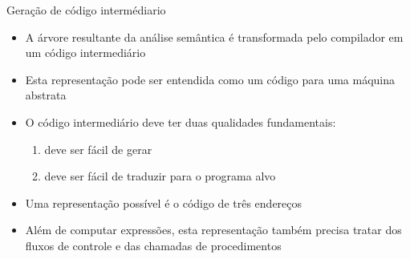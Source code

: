 \begin{frame}[fragile]{Geração de código intermédiario}

    \begin{itemize}
        \item A árvore resultante da análise semântica é transformada pelo compilador em um código intermediário

        \item Esta representação pode ser entendida como um código para uma máquina abstrata

        \item O código intermediário deve ter duas qualidades fundamentais:
        \begin{enumerate}
            \item deve ser fácil de gerar

            \item deve ser fácil de traduzir para o programa alvo
        \end{enumerate}

        \item Uma representação possível é o código de três endereços

        \item Além de computar expressões, esta representação também precisa tratar dos fluxos de controle e das chamadas de procedimentos
    \end{itemize}

\end{frame}

